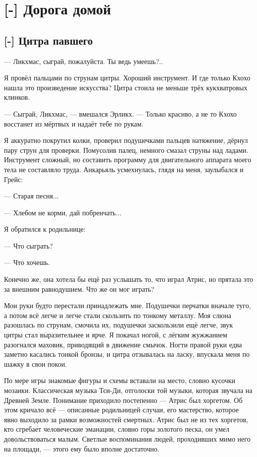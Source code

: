 \chapter{[-] Дорога домой}

\section{[-] Цитра павшего}

\textspace

--- Ликхмас, сыграй, пожалуйста.
Ты ведь умеешь?..

Я провёл пальцами по струнам цитры.
Хороший инструмент.
И где только Кхохо нашла это произведение искусства?
Цитра стоила не меньше трёх кукхватровых клинков.

--- Сыграй, Ликхмас, --- вмешался Эрликх.
--- Только красиво, а не то Кхохо восстанет из мёртвых и надаёт тебе по рукам.

Я аккуратно покрутил колки, проверил подушечками пальцев натяжение, дёрнул пару струн для проверки.
Помусолив палец, немного смазал струны над ладами.
Инструмент сложный, но составить программу для двигательного аппарата моего тела не составляло труда.
Анкарьяль усмехнулась, глядя на меня, заулыбался и Грейс:

--- Старая песня...

--- Хлебом не корми, дай побренчать...

Я обратился к родильнице:

--- Что сыграть?

--- Что хочешь.

Конечно же, она хотела бы ещё раз услышать то, что играл Атрис, но прятала это за внешним равнодушием.
Что же он мог играть?

Мои руки будто перестали принадлежать мне.
Подушечки перчатки вначале туго, а потом всё легче и легче стали скользить по тонкому металлу.
Моя слюна разошлась по струнам, смочила их, подушечки заскользили ещё легче, звук цитры стал выразительнее и ярче.
Я покачал ногой, с лёгким жужжанием разогнался маховик, приводящий в движение смычок.
Ногти правой руки едва заметно касались тонкой бронзы, и цитра отзывалась на ласку, впускала меня по шажку в свои покои.

По мере игры знакомые фигуры и схемы вставали на место, словно кусочки мозаики.
Классическая музыка Тси-Ди, отголоски той музыки, которая звучала на Древней Земле.
Понимание приходило постепенно --- Атрис был хоргетом.
Об этом кричало всё --- описанные родильницей случаи, его мастерство, которое явно выходило за рамки возможностей смертных.
Атрис был не из тех хоргетов, кто сгребает человеческие эманации, словно горы золотого песка, он умел довольствоваться малым.
Светлые воспоминания людей, проходивших мимо него на площади, --- этого ему было вполне достаточно.

